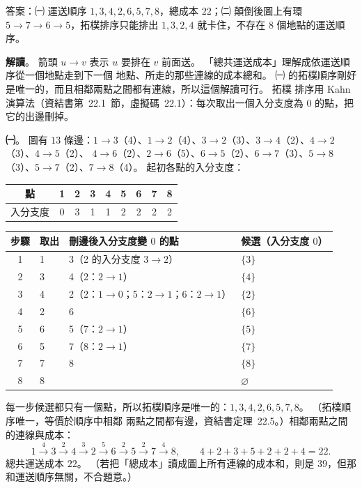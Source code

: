 \begin{pastsoln}
答案：㈠ 運送順序 $1, 3, 4, 2, 6, 5, 7, 8$，總成本 $22$；㈡ 顛倒後圖上有環 $5 \to 7 \to 6 \to 5$，拓樸排序只能排出
$1, 3, 2, 4$ 就卡住，不存在 $8$ 個地點的運送順序。

\textbf{解讀}。 箭頭 $u \to v$ 表示 $u$ 要排在 $v$ 前面送。 「總共運送成本」理解成依運送順序從一個地點走到下一個
地點、所走的那些連線的成本總和。 ㈠ 的拓樸順序剛好是唯一的，而且相鄰兩點之間都有連線，所以這個解讀可行。 拓樸
排序用 Kahn 演算法（資結書第~22.1~節，虛擬碼~22.1）：每次取出一個入分支度為 $0$ 的點，把它的出邊刪掉。

\textbf{㈠}。 圖有 $13$ 條邊：$1 \to 3$（4）、$1 \to 2$（4）、$3 \to 2$（3）、$3 \to 4$（2）、$4 \to 2$（3）、$4 \to 5$（2）、
$4 \to 6$（2）、$2 \to 6$（5）、$6 \to 5$（2）、$6 \to 7$（3）、$5 \to 8$（3）、$5 \to 7$（2）、$7 \to 8$（4）。 起初各點的入分支度：
\begin{center}
\begin{tabular}{c*{8}{c}}
\toprule
點 & 1 & 2 & 3 & 4 & 5 & 6 & 7 & 8 \\
\midrule
入分支度 & 0 & 3 & 1 & 1 & 2 & 2 & 2 & 2 \\
\bottomrule
\end{tabular}
\end{center}
\begin{center}
\small
\begin{tabular}{clll}
\toprule
步驟 & 取出 & 刪邊後入分支度變 $0$ 的點 & 候選（入分支度 $0$） \\
\midrule
1 & 1 & 3（2 的入分支度 $3 \to 2$） & $\{3\}$ \\
2 & 3 & 4（2：$2 \to 1$） & $\{4\}$ \\
3 & 4 & 2（2：$1 \to 0$；5：$2 \to 1$；6：$2 \to 1$） & $\{2\}$ \\
4 & 2 & 6 & $\{6\}$ \\
5 & 6 & 5（7：$2 \to 1$） & $\{5\}$ \\
6 & 5 & 7（8：$2 \to 1$） & $\{7\}$ \\
7 & 7 & 8 & $\{8\}$ \\
8 & 8 & & $\varnothing$ \\
\bottomrule
\end{tabular}
\end{center}
每一步候選都只有一個點，所以拓樸順序是唯一的：$1, 3, 4, 2, 6, 5, 7, 8$。 （拓樸順序唯一，等價於順序中相鄰
兩點之間都有邊，資結書定理~22.5。）相鄰兩點之間的連線與成本：
\[
1 \xrightarrow{4} 3 \xrightarrow{2} 4 \xrightarrow{3} 2 \xrightarrow{5} 6 \xrightarrow{2} 5 \xrightarrow{2} 7 \xrightarrow{4} 8,
\qquad 4 + 2 + 3 + 5 + 2 + 2 + 4 = 22.
\]
總共運送成本 $22$。 （若把「總成本」讀成圖上所有連線的成本和，則是 $39$，但那和運送順序無關，不合題意。）


\end{pastsoln}
